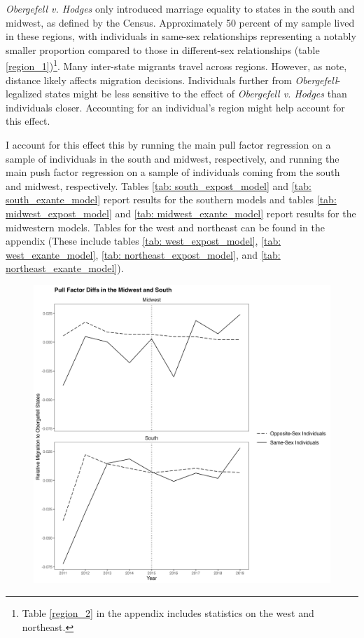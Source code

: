 \documentclass[12pt,letterpaper]{article}
\begin{document}
\textit{Obergefell v. Hodges} only introduced marriage equality to states in the south and midwest, as defined by the Census. Approximately 50 percent of my sample lived in these regions, with individuals in same-sex relationships representing a notably smaller proportion compared to those in different-sex relationships (table \ref{region_1})\footnote{Table \ref{region_2} in the appendix includes statistics on the west and northeast.}. Many inter-state migrants travel across regions. However, as \citet{1} note, distance likely affects migration decisions. Individuals further from \textit{Obergefell}-legalized states might be less sensitive to the effect of \textit{Obergefell v. Hodges} than individuals closer. Accounting for an individual’s region might help account for this effect.


I account for this effect this by running the main pull factor regression on a sample of individuals in the south and midwest, respectively, and running the main push factor regression on a sample of individuals coming from the south and midwest, respectively. Tables \ref{tab: south_expost_model} and \ref{tab: south_exante_model} report results for the southern models and tables \ref{tab: midwest_expost_model} and \ref{tab: midwest_exante_model} report results for the midwestern models. Tables for the west and northeast can be found in the appendix (These include tables \ref{tab: west_expost_model}, \ref{tab: west_exante_model}, \ref{tab: northeast_expost_model}, and \ref{tab: northeast_exante_model}).


\begin{figure}[htbp]
    \centering
    \includegraphics[width=1\linewidth]{outputs/summary_stats/region_post_diffs.png}
    \caption{}
    \label{fig: region_post_diffs}
\end{figure}
\end{document}

